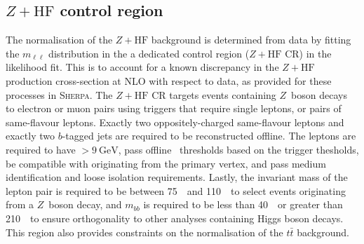\subsection{$Z+\text{HF}$ control region}
\label{sec:selection:zcr}

The normalisation of the $Z+\text{HF}$ background is determined 
from data by fitting the $m_{\ell\ell}$ distribution in the  a dedicated control region 
($Z+\text{HF}$ CR) in the likelihood fit. 
This is to account for a known discrepancy in the $Z+\text{HF}$ production
cross-section at NLO with respect to data, as provided for these processes in \textsc{Sherpa}. 
The $Z+\text{HF}$ CR targets events containing $Z$~boson decays to electron or muon pairs 
using triggers that require single leptons, or pairs of same-flavour leptons. 
Exactly two oppositely-charged same-flavour leptons and exactly two $b$-tagged jets are required 
to be reconstructed offline. The leptons are required to have \pt$>9~\text{GeV}$, 
pass offline \pt\ thresholds based on the trigger thesholds, 
be compatible with originating from the primary vertex, 
and pass medium identification and loose isolation requirements. 
Lastly, the invariant mass of the lepton pair is required to be between 75~\GeV\ 
and 110~\GeV\ to select events originating from a $Z$~boson decay, 
and $m_{bb}$ is required to be less than 40~\GeV\ or greater than 210~\GeV\ 
to ensure orthogonality to other analyses containing Higgs boson decays. 
This region also provides constraints on the normalisation of the $t\bar t$ background. 


